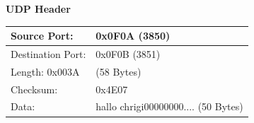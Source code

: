 \textbf{UDP Header}

\begin{tabular}[h]{|l|l|}
	\hline
	Source Port: & 0x0F0A (3850) \\
	\hline
	Destination Port: & 0x0F0B (3851) \\
	\hline
	Length: 0x003A & (58 Bytes) \\
	\hline
	Checksum: & 0x4E07 \\
	\hline
	Data: & hallo chrigi00000000.... (50 Bytes) \\
	\hline
\end{tabular}
